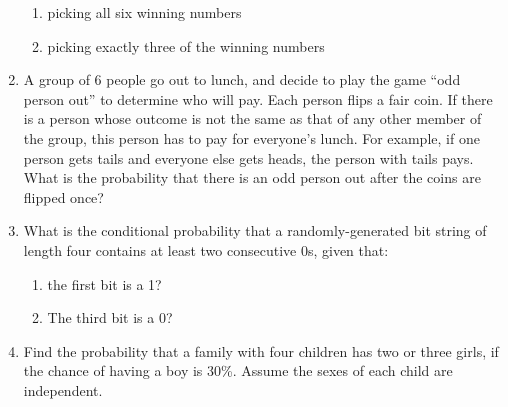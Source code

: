 \documentclass[12pt]{article}
\begin{document}
\begin{enumerate}
\begin{enumerate}[itemsep=\fill,after=\vfill]
\item picking all six winning numbers

\item picking exactly three of the winning numbers

\end{enumerate} %



\item A group of 6 people go out to lunch, and decide to play the game ``odd
person out'' to determine who will pay. Each person flips a fair coin. If there
is a person whose outcome is not the same as that of any other member of the
group, this person has to pay for everyone's lunch. For example, if one person
gets tails and everyone else gets heads, the person with tails pays. What is the
probability that there is an odd person out after the coins are flipped once?

\vfill
\vfill

\newpage



\item What is the conditional probability that a randomly-generated bit string
of length four contains at least two consecutive 0s, given that:
%
\begin{enumerate}[itemsep=\fill,after=\vfill] %

\item the first bit is a 1?

\item The third bit is a 0?

\end{enumerate} %



\item Find the probability that a family with four children has two or three
girls, if the chance of having a boy is 30\%. Assume the sexes of each child are
independent.

\vfill

\end{enumerate} %
\end{document}
